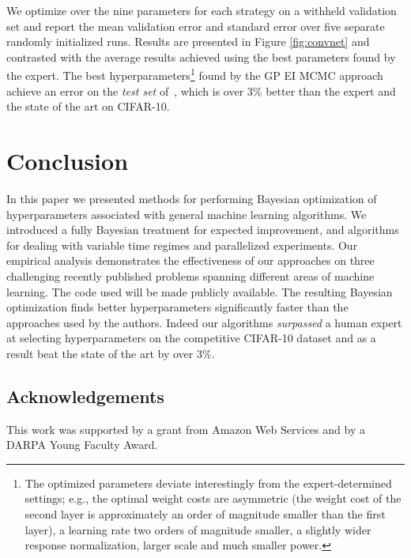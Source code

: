 \documentclass[aos,preprint]{imsart}
\begin{document}
We optimize over the nine parameters for each strategy on a withheld
validation set and report the mean validation error and standard error
over five separate randomly initialized runs.  Results are presented
in Figure \ref{fig:convnet} and contrasted with the average results
achieved using the best parameters found by the expert.  The best
hyperparameters\footnote{The optimized parameters deviate
  interestingly from the expert-determined settings; 
  e.g., the optimal weight costs are asymmetric (the weight cost of the
  second layer is approximately an order of magnitude smaller than the
  first layer), a learning rate two orders of magnitude smaller,
  a slightly wider response normalization, larger scale and much
  smaller power.} found by the GP EI MCMC approach achieve an error on
the \emph{test set} of~, which is over 3\% better than the
expert and the state of the art on CIFAR-10.

\section{Conclusion}
In this paper we presented methods for performing Bayesian
optimization of hyperparameters associated with general machine
learning algorithms.  We introduced a fully Bayesian treatment for
expected improvement, and algorithms for dealing with variable time
regimes and parallelized experiments.  Our empirical analysis
demonstrates the effectiveness of our approaches on three challenging
recently published problems spanning different areas of machine
learning.  The code used will be made publicly available.  The
resulting Bayesian optimization finds better hyperparameters
significantly faster than the approaches used by the authors. Indeed
our algorithms \emph{surpassed} a human expert at selecting
hyperparameters on the competitive CIFAR-10 dataset and as a result
beat the state of the art by over 3\%.

\subsection*{Acknowledgements}
This work was supported by a grant from Amazon Web Services and by a
DARPA Young Faculty Award.

 
\end{document}
